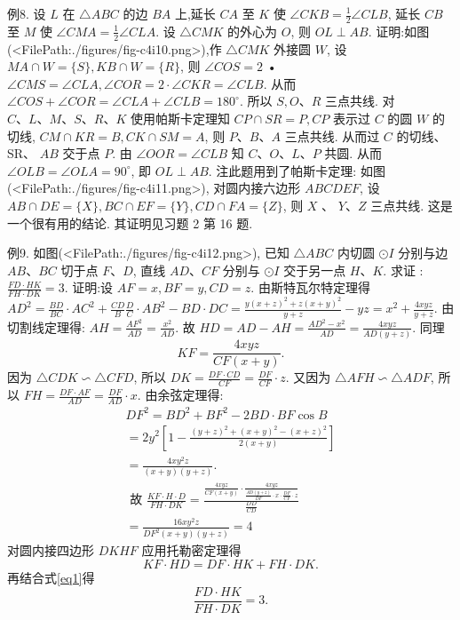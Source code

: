 例8. 设 $L$ 在 $\triangle A B C$ 的边 $B A$ 上,延长 $C A$ 至 $K$ 使 $\angle C K B=\frac{1}{2} \angle C L B$, 延长 $C B$ 至 $M$ 使 $\angle C M A=\frac{1}{2} \angle C L A$. 设 $\triangle C M K$ 的外心为 $O$, 则 $O L \perp A B$.
证明:如图(<FilePath:./figures/fig-c4i10.png>),作 $\triangle C M K$ 外接圆 $W$, 设 $M A \cap W=\{S\}, K B \cap W=\{R\}$, 则 $\angle C O S=2$ • $\angle C M S=\angle C L A, \angle C O R=2 \cdot \angle C K R=\angle C L B$. 从而 $\angle C O S+\angle C O R=\angle C L A+\angle C L B=180^{\circ}$. 所以 $S, O 、 R$ 三点共线.
对 $C 、 L 、 M 、 S 、 R 、 K$ 使用帕斯卡定理知 $C P \cap S R=P, C P$ 表示过 $C$ 的圆 $W$ 的切线, $C M \cap K R=B, C K \cap S M=A$, 则 $P 、 B 、 A$ 三点共线.
从而过 $C$ 的切线、SR、 $A B$ 交于点 $P$. 由 $\angle O O R= \angle C L B$ 知 $C 、 O 、 L 、 P$ 共圆.
从而 $\angle O L B=\angle O L A=90^{\circ}$, 即 $O L \perp A B$. 注此题用到了帕斯卡定理:
如图(<FilePath:./figures/fig-c4i11.png>), 对圆内接六边形 $A B C D E F$, 设 $A B \cap D E=\{X\}, B C \cap E F=\{Y\}, C D \cap F A=\{Z\}$, 则 $X$ 、 $Y 、 Z$ 三点共线.
这是一个很有用的结论.
其证明见习题 2 第 16 题.



例9. 如图(<FilePath:./figures/fig-c4i12.png>), 已知 $\triangle A B C$ 内切圆 $\odot I$ 分别与边 $A B 、 B C$ 切于点 $F 、 D$, 直线 $A D 、 C F$ 分别与 $\odot I$ 交于另一点 $H 、 K$. 求证 : $\frac{F D \cdot H K}{F H \cdot D K}=3$.
证明:设 $A F=x, B F=y, C D=z$. 由斯特瓦尔特定理得 $A D^2=\frac{B D}{B C} \cdot A C^2+\frac{C D}{B} \frac{D}{C} \cdot A B^2- B D \cdot D C=\frac{y(x+z)^2+z(x+y)^2}{y+z}-y z=x^2+ \frac{4 x y z}{y+z}$. 由切割线定理得: $A H=\frac{A F^2}{A D}=\frac{x^2}{A D}$. 故 $H D=A D-A H=\frac{A D^2-x^2}{A D}=\frac{4 x y z}{A D(y+z)}$.
同理
$$
K F=\frac{4 x y z}{C F(x+y)} .
$$
因为 $\triangle C D K \backsim \triangle C F D$, 所以 $D K=\frac{D F \cdot C D}{C F}=\frac{D F}{C F} \cdot z$.
又因为 $\triangle A F H \backsim \triangle A D F$, 所以 $F H=\frac{D F \cdot A F}{A D}=\frac{D F}{A D} \cdot x$.
由余弦定理得:
$$
\begin{gathered}
D F^2=B D^2+B F^2-2 B D \cdot B F \cos B \\
=2 y^2\left[1-\frac{(y+z)^2+(x+y)^2-(x+z)^2}{2(x+y)}\right] \\
=\frac{4 x y^2 z}{(x+y)(y+z)} . \\
\text { 故 } \frac{K F \cdot H \cdot D}{F H \cdot D K}=\frac{\frac{4 x y z}{C F(x+y)} \cdot \frac{4 x y z}{\frac{A D(y+z)}{D F} \cdot x \cdot \frac{D F}{C F} \cdot z}}{\frac{D D}{C D}} \\
=\frac{16 x y^2 z}{D F^2(x+y)(y+z)}=4
\end{gathered} \label{eq1}
$$
对圆内接四边形 $D K H F$ 应用托勒密定理得
$$
K F \cdot H D=D F \cdot H K+F H \cdot D K . 
$$
再结合式\ref{eq1}得
$$
\frac{F D \cdot H K}{F H \cdot D K}=3 .
$$



